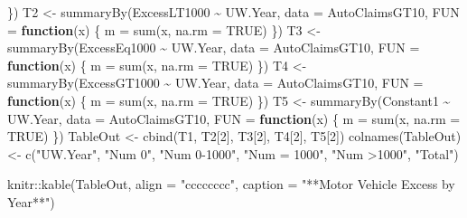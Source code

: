 \documentclass[
]{book}
\newenvironment{Shaded}{\begin{snugshade}}{\end{snugshade}}
\newcommand{\AttributeTok}[1]{\textcolor[rgb]{0.77,0.63,0.00}{#1}}
\newcommand{\ConstantTok}[1]{\textcolor[rgb]{0.00,0.00,0.00}{#1}}
\newcommand{\ControlFlowTok}[1]{\textcolor[rgb]{0.13,0.29,0.53}{\textbf{#1}}}
\newcommand{\DecValTok}[1]{\textcolor[rgb]{0.00,0.00,0.81}{#1}}
\newcommand{\FunctionTok}[1]{\textcolor[rgb]{0.00,0.00,0.00}{#1}}
\newcommand{\NormalTok}[1]{#1}
\newcommand{\OtherTok}[1]{\textcolor[rgb]{0.56,0.35,0.01}{#1}}
\newcommand{\SpecialCharTok}[1]{\textcolor[rgb]{0.00,0.00,0.00}{#1}}
\newcommand{\StringTok}[1]{\textcolor[rgb]{0.31,0.60,0.02}{#1}}
\begin{document}
\begin{Shaded}
\begin{Highlighting}[]
\NormalTok{\})}
\NormalTok{T2 }\OtherTok{\textless{}{-}} \FunctionTok{summaryBy}\NormalTok{(ExcessLT1000 }\SpecialCharTok{\textasciitilde{}}\NormalTok{ UW.Year, }\AttributeTok{data =}\NormalTok{ AutoClaimsGT10, }\AttributeTok{FUN =} \ControlFlowTok{function}\NormalTok{(x) \{}
\NormalTok{    m }\OtherTok{=} \FunctionTok{sum}\NormalTok{(x, }\AttributeTok{na.rm =} \ConstantTok{TRUE}\NormalTok{)}
\NormalTok{\})}
\NormalTok{T3 }\OtherTok{\textless{}{-}} \FunctionTok{summaryBy}\NormalTok{(ExcessEq1000 }\SpecialCharTok{\textasciitilde{}}\NormalTok{ UW.Year, }\AttributeTok{data =}\NormalTok{ AutoClaimsGT10, }\AttributeTok{FUN =} \ControlFlowTok{function}\NormalTok{(x) \{}
\NormalTok{    m }\OtherTok{=} \FunctionTok{sum}\NormalTok{(x, }\AttributeTok{na.rm =} \ConstantTok{TRUE}\NormalTok{)}
\NormalTok{\})}
\NormalTok{T4 }\OtherTok{\textless{}{-}} \FunctionTok{summaryBy}\NormalTok{(ExcessGT1000 }\SpecialCharTok{\textasciitilde{}}\NormalTok{ UW.Year, }\AttributeTok{data =}\NormalTok{ AutoClaimsGT10, }\AttributeTok{FUN =} \ControlFlowTok{function}\NormalTok{(x) \{}
\NormalTok{    m }\OtherTok{=} \FunctionTok{sum}\NormalTok{(x, }\AttributeTok{na.rm =} \ConstantTok{TRUE}\NormalTok{)}
\NormalTok{\})}
\NormalTok{T5 }\OtherTok{\textless{}{-}} \FunctionTok{summaryBy}\NormalTok{(Constant1 }\SpecialCharTok{\textasciitilde{}}\NormalTok{ UW.Year, }\AttributeTok{data =}\NormalTok{ AutoClaimsGT10, }\AttributeTok{FUN =} \ControlFlowTok{function}\NormalTok{(x) \{}
\NormalTok{    m }\OtherTok{=} \FunctionTok{sum}\NormalTok{(x, }\AttributeTok{na.rm =} \ConstantTok{TRUE}\NormalTok{)}
\NormalTok{\})}
\NormalTok{TableOut }\OtherTok{\textless{}{-}} \FunctionTok{cbind}\NormalTok{(T1, T2[}\DecValTok{2}\NormalTok{], T3[}\DecValTok{2}\NormalTok{], T4[}\DecValTok{2}\NormalTok{], T5[}\DecValTok{2}\NormalTok{])}
\FunctionTok{colnames}\NormalTok{(TableOut) }\OtherTok{\textless{}{-}} \FunctionTok{c}\NormalTok{(}\StringTok{"UW.Year"}\NormalTok{, }\StringTok{"Num 0"}\NormalTok{, }\StringTok{"Num 0{-}1000"}\NormalTok{, }\StringTok{"Num = 1000"}\NormalTok{, }\StringTok{"Num \textgreater{}1000"}\NormalTok{,}
    \StringTok{"Total"}\NormalTok{)}

\NormalTok{knitr}\SpecialCharTok{::}\FunctionTok{kable}\NormalTok{(TableOut, }\AttributeTok{align =} \StringTok{"cccccccc"}\NormalTok{, }\AttributeTok{caption =} \StringTok{"**Motor Vehicle Excess by Year**"}\NormalTok{)}
\end{Highlighting}
\end{Shaded}
\end{document}
